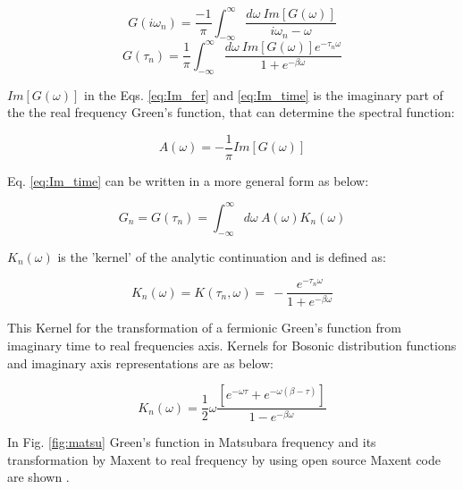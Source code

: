 \begin{equation}
    G(i\omega _n) = \frac{-1}{\pi} \int _{-\infty} ^{\infty} \frac{d\omega \: Im[G(\omega)]}{i\omega _n - \omega}
    \label{eq:Im_fer}
\end{equation}
\begin{equation}
    G(\tau _n) = \frac{1}{\pi} \int _{-\infty} ^{\infty} \frac{d\omega \: Im[G(\omega)] e^{-\tau _n \omega}}{1+ e^{-\beta \omega}}
    \label{eq:Im_time}
\end{equation}

\noindent $Im[G(\omega)]$ in the Eqs. \ref{eq:Im_fer} and \ref{eq:Im_time} is the imaginary part of the the real frequency Green's function, that can determine the spectral function:

\begin{equation}
    A(\omega) = -\frac{1}{\pi}Im[G(\omega)] 
\end{equation}

\noindent Eq. \ref{eq:Im_time} can be written in a more general form as below:

\begin{equation}
    G_n = G(\tau _n) =\int _{-\infty} ^{\infty} d\omega \: A(\omega) K_n (\omega)
\end{equation}

\noindent $ K_n (\omega)$ is the 'kernel' of the analytic continuation and is defined as:
 
 \begin{equation}
    K_n (\omega)= K(\tau _n , \omega) = \: -\frac{e^{-\tau _n \omega}}{1+ e^{-\beta \omega}} 
 \end{equation}
 
 This Kernel for the transformation of a fermionic Green's function from imaginary time to real frequencies axis. Kernels for Bosonic distribution functions and imaginary axis representations are as below:
 
 \begin{equation}
    K_n (\omega)= \frac{1}{2} \omega \frac{[e^{-\omega \tau}+e^{-\omega(\beta - \tau)}]}{1- e^{-\beta \omega}} 
 \end{equation}

In Fig. \ref{fig:matsu} Green's function in Matsubara frequency and its transformation by Maxent to real frequency by using open source Maxent code are shown \cite{Ryan}.


